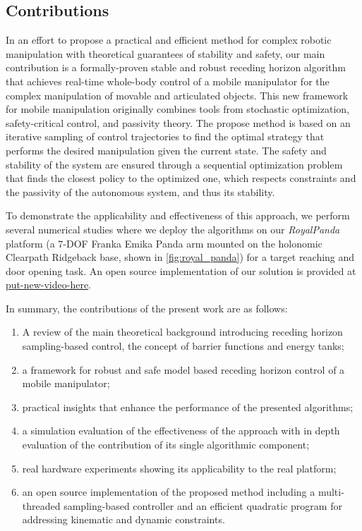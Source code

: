 \subsection{Contributions}

In an effort to propose a practical and efficient method for complex robotic manipulation with theoretical guarantees of stability and safety, our main contribution is a formally-proven stable and robust receding horizon algorithm that achieves real-time whole-body control of a mobile manipulator for the complex manipulation of movable and articulated objects. This new framework for mobile manipulation originally combines tools from stochastic optimization, safety-critical control, and passivity theory. The propose method is based on an iterative sampling of control trajectories to find the optimal strategy that performs the desired manipulation given the current state. The safety and stability of the system are ensured through a sequential optimization problem that finds the closest policy to the optimized one, which respects constraints and the passivity of the autonomous system, and thus its stability. 


To demonstrate the applicability and effectiveness of this approach, we perform several numerical studies where we deploy the algorithms on our \textit{RoyalPanda} platform (a 7-DOF Franka Emika Panda arm mounted on the holonomic Clearpath Ridgeback base, shown in \fig\ref{fig:royal_panda}) for a target reaching and door opening task. An open source implementation of our solution is provided at \url{put-new-video-here}.

In summary, the contributions of the present work are as follows:
\begin{enumerate}
    \item A review of the main theoretical background introducing receding horizon sampling-based control, the concept of barrier functions and energy tanks;
    \item a framework for robust and safe model based receding horizon control of a mobile manipulator;
    \item practical insights that enhance the performance of the presented algorithms;
    \item a simulation evaluation of the effectiveness of the approach with in depth evaluation of the contribution of its single algorithmic component;
    \item real hardware experiments showing its applicability to the real platform;
    \item an open source implementation of the proposed method including a multi-threaded sampling-based controller and an efficient quadratic program for addressing kinematic and dynamic constraints.
    \end{enumerate}

